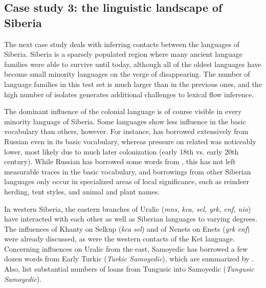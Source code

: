 \subsection{Case study 3: the linguistic landscape of Siberia}
The next case study deals with inferring contacts between the languages of Si\-be\-ria. Si\-be\-ria is a sparsely populated region where many ancient language families were able to survive until today, although all of the oldest languages have become small minority languages on the verge of disappearing. The number of language families in this test set is much larger than in the previous ones, and the high number of isolates generates additional challenges to lexical flow inference.

The dominant influence of the colonial language  is of course visible in every minority language of Siberia. Some languages show less influence in the basic vocabulary than others, however. For instance,  has borrowed extensively from Russian even in its basic vocabulary, whereas pressure on related  was noticeably lower, most likely due to much later colonization (early 18th vs. early 20th century). While Russian has borrowed some words from , this has not left measurable traces in the basic vocabulary, and borrowings from other Siberian languages only occur in specialized areas of local significance, such as reindeer herding, tent styles, and animal and plant names.

In western Siberia, the eastern branches of Uralic (\textit{mns, kca, sel, yrk, enf, nio}) have interacted with each other as well as Siberian languages to varying degrees. The influences of Khanty on Selkup (\textit{kca} \arrowOA \textit{sel}) and of Nenets on Enets (\textit{yrk} \arrowOA \textit{enf}) were already discussed, as were the western contacts of the Ket language. Concerning influences on Uralic from the east, Samoyedic has borrowed a few dozen words from Early Turkic (\textit{Turkic \arrowLA Samoyedic}), which are summarized by \cite{dybo2007}. Also, \cite{anikin_helimski_2007} list substantial numbers of loans from Tungusic into Samoyedic (\textit{Tungusic} \arrowLA \textit{Samoyedic}).

